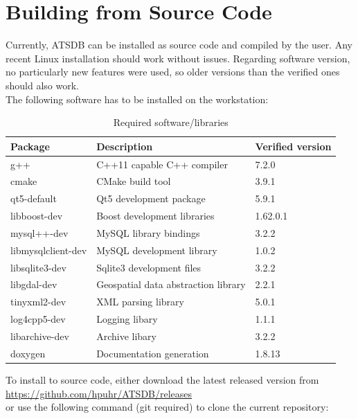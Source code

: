 \documentclass[10pt,letterpaper,extrafontsizes]{memoir}
\begin{document}
\section{Building from Source Code}
Currently, ATSDB can be installed as source code and compiled by the user. Any recent Linux installation should work without issues. Regarding software version, no particularly new features were used, so older versions than the verified ones should also work. \\

The following software has to be installed on the workstation:

\begin{table}[H]
  \center
  \begin{tabular}{ | l | l | l |}
    \hline
    \textbf{Package} & \textbf{Description} & \textbf{Verified version} \\ \hline
    g++ & C++11 capable C++ compiler & 7.2.0 \\ \hline
    cmake & CMake build tool & 3.9.1 \\ \hline
    qt5-default & Qt5 development package & 5.9.1 \\ \hline
    libboost-dev & Boost development libraries & 1.62.0.1 \\ \hline
    mysql++-dev & MySQL library bindings & 3.2.2 \\ \hline
    libmysqlclient-dev & MySQL development library & 1.0.2 \\ \hline
    libsqlite3-dev & Sqlite3 development files & 3.2.2 \\ \hline
    libgdal-dev & Geospatial data abstraction library & 2.2.1 \\ \hline
    tinyxml2-dev & XML parsing library & 5.0.1 \\ \hline
    log4cpp5-dev & Logging libary & 1.1.1 \\ \hline
    libarchive-dev & Archive libary & 3.2.2 \\ \hline
    doxygen & Documentation generation & 1.8.13 \\ 
    \hline
  \end{tabular}
  \caption{Required software/libraries}
\end{table}

To install to source code, either download the latest released version from \\ \url{https://github.com/hpuhr/ATSDB/releases} \\
or use the following command (git required) to clone the current repository:
\end{document}
